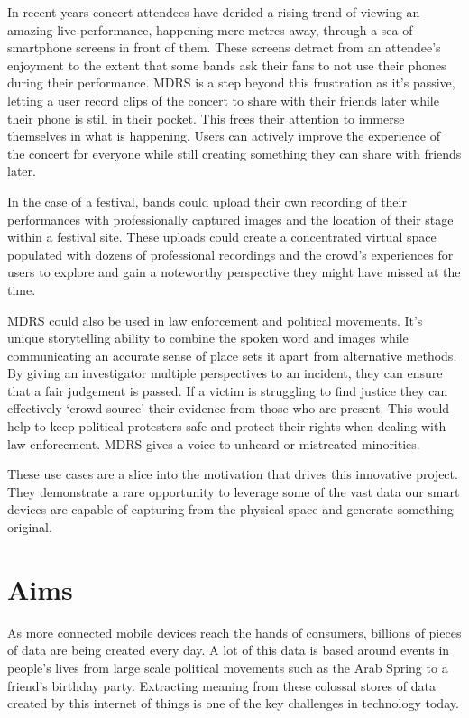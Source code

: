 \documentclass{l3proj}
\begin{document}
In recent years concert attendees have derided a rising trend of viewing an amazing live performance, happening mere metres away, through a sea of smartphone screens in front of them. These screens detract from an attendee's enjoyment to the extent that  some bands ask their fans to not use their phones during their performance. MDRS is a step beyond this frustration as it's passive, letting a user record clips of the concert to share with their friends later while their phone is still in their pocket. This frees their attention to immerse themselves in what is happening. Users can actively improve the experience of the concert for everyone while still creating something they can share with friends later.

In the case of a festival, bands could upload their own recording of their performances with professionally captured images and the location of their stage within a festival site. These uploads could create a concentrated virtual space populated with dozens of  professional recordings and the crowd’s experiences for users to explore and gain a noteworthy perspective they might have missed at the time.

MDRS could also be used in law enforcement and political movements. It's unique storytelling ability to combine the spoken word and images while communicating an accurate sense of place sets it apart from alternative methods. By giving an investigator multiple perspectives to an incident, they can ensure that a fair judgement is passed. If a victim is struggling to find justice they can effectively ‘crowd-source’ their evidence from those who are present. This would help to keep political protesters safe and protect their rights when dealing with law enforcement. MDRS gives a voice to unheard or mistreated minorities.

These use cases are a slice into the motivation that drives this innovative project. They demonstrate a rare opportunity to leverage some of the vast data our smart devices are capable of capturing from the physical space and generate something original.

\section{Aims}
As more connected mobile devices reach the hands of consumers, billions of pieces of data are being created every day. A lot of this data is based around events in people’s lives from large scale political movements such as the Arab Spring to a friend's birthday party. Extracting meaning from these colossal stores of data created by this internet of things is one of the key challenges in technology today.
\end{document}
